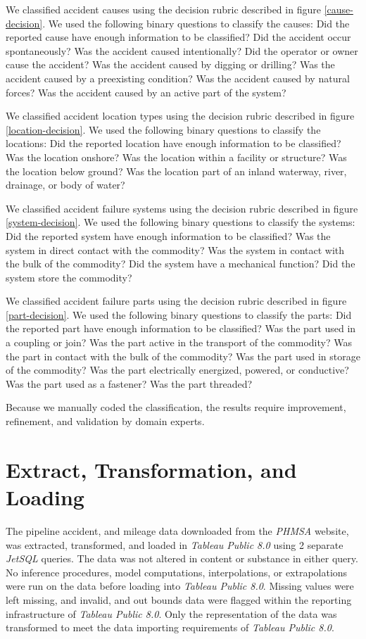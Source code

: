 \documentclass[letterpaper,10pt,oneside,final,onecolumn]{article}
\begin{document}
	We classified accident causes using the decision rubric described in figure \ref{cause-decision}.
	We used the following binary questions to classify the causes:
	Did the reported cause have enough information to be classified?
	Did the accident occur spontaneously?
	Was the accident caused intentionally?
	Did the operator or owner cause the accident?
	Was the accident caused by digging or drilling?
	Was the accident caused by a preexisting condition?
	Was the accident caused by natural forces?
	Was the accident caused by an active part of the system?

	We classified accident location types using the decision rubric described in figure \ref{location-decision}.
	We used the following binary questions to classify the locations:
	Did the reported location have enough information to be classified?
	Was the location onshore?
	Was the location within a facility or structure?
	Was the location below ground?
	Was the location part of an inland waterway, river, drainage, or body of water?

	We classified accident failure systems using the decision rubric described in figure \ref{system-decision}.
	We used the following binary questions to classify the systems:
	Did the reported system have enough information to be classified?
	Was the system in direct contact with the commodity?
	Was the system in contact with the bulk of the commodity?
	Did the system have a mechanical function?
	Did the system store the commodity?

	We classified accident failure parts using the decision rubric described in figure \ref{part-decision}.
	We used the following binary questions to classify the parts:
	Did the reported part have enough information to be classified?
	Was the part used in a coupling or join?
	Was the part active in the transport of the commodity?
	Was the part in contact with the bulk of the commodity?
	Was the part used in storage of the commodity?
	Was the part electrically energized, powered, or conductive?
	Was the part used as a fastener?
	Was the part threaded?

	Because we manually coded the classification, the results require improvement, refinement, and validation by domain experts.

	\section{Extract, Transformation, and Loading}
	The pipeline accident, and mileage data downloaded from the \textit{PHMSA} website, was extracted, transformed, and loaded in \textit{Tableau Public 8.0} using 2 separate \textit{JetSQL} queries.
	The data was not altered in content or substance in either query.
	No inference procedures, model computations, interpolations, or extrapolations were run on the data before loading into \textit{Tableau Public 8.0}.
	Missing values were left missing, and invalid, and out bounds data were flagged within the reporting infrastructure of \textit{Tableau Public 8.0}.
	Only the representation of the data was transformed to meet the data importing requirements of \textit{Tableau Public 8.0}.
\end{document}

